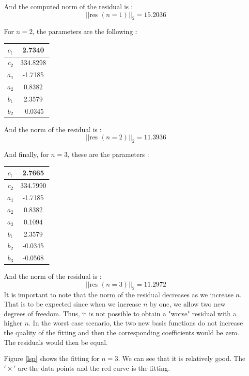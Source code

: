 And the computed norm of the residual is :
$$||\text{res }(n=1)||_2=15.2036$$

For $n=2$, the parameters are the following : 

\begin{center}
\begin{tabular}{|c|c|}
\hline 
$c_1$ & 2.7340 \\ 
\hline 
$c_2$ & 334.8298 \\ 
\hline 
$a_1$ & -1.7185 \\ 
\hline 
$a_2$ & 0.8382 \\
\hline
$b_1$ & 2.3579 \\ 
\hline 
$b_2$ & -0.0345\\
\hline
\end{tabular} 
\end{center}

And the norm of the residual is :
$$||\text{res }(n=2)||_2=11.3936$$

And finally, for $n=3$, these are the parameters : 

\begin{center}
\begin{tabular}{|c|c|}
\hline 
$c_1$ & 2.7665 \\ 
\hline 
$c_2$ & 334.7990 \\ 
\hline 
$a_1$ & -1.7185 \\ 
\hline 
$a_2$ & 0.8382 \\
\hline
$a_3$ & 0.1094\\
\hline
$b_1$ & 2.3579 \\ 
\hline 
$b_2$ & -0.0345\\
\hline
$b_3$ & -0.0568\\
\hline
\end{tabular} 
\end{center}

And the norm of the residual is :
$$||\text{res }(n=3)||_2=11.2972$$
It is important to note that the norm of the residual decreases as we increase $n$. That is to be expected since when we increase $n$ by one, we allow two new degrees of freedom. Thus, it is not possible to obtain a "worse" residual with a higher $n$. In the worst case scenario, the two new basis functions do not increase the quality of the fitting and then the corresponding coefficients would be zero. The residuals would then be equal.

Figure \ref{lsp} shows the fitting for $n=3$. We can see that it is relatively good. The $'\times'$ are the data points and the red curve is the fitting.

